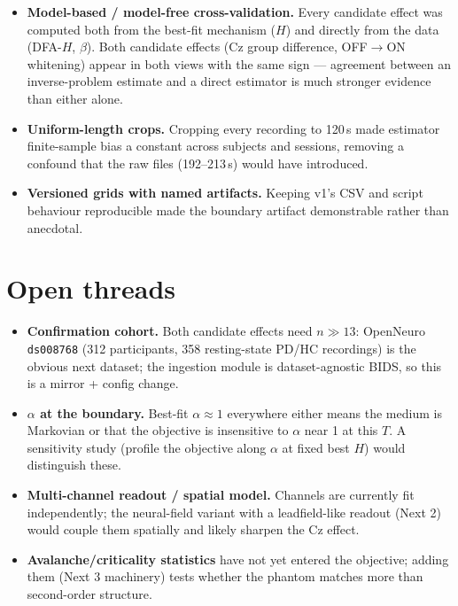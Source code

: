 \documentclass[11pt]{article}
\begin{document}
\begin{itemize}[leftmargin=1.6em]
  \item \textbf{Model-based / model-free cross-validation.} Every candidate
        effect was computed both from the best-fit mechanism ($H$) and
        directly from the data (DFA-$H$, $\beta$). Both candidate effects
        (Cz group difference, OFF$\to$ON whitening) appear in both views with
        the same sign --- agreement between an inverse-problem estimate and a
        direct estimator is much stronger evidence than either alone.
  \item \textbf{Uniform-length crops.} Cropping every recording to 120\,s
        made estimator finite-sample bias a constant across subjects and
        sessions, removing a confound that the raw files (192--213\,s) would
        have introduced.
  \item \textbf{Versioned grids with named artifacts.} Keeping v1's CSV and
        script behaviour reproducible made the boundary artifact
        demonstrable rather than anecdotal.
\end{itemize}

\section{Open threads}

\begin{itemize}[leftmargin=1.6em]
  \item \textbf{Confirmation cohort.} Both candidate effects need $n \gg 13$:
        OpenNeuro \texttt{ds008768} (312 participants, 358 resting-state PD/HC
        recordings) is the obvious next dataset; the ingestion module is
        dataset-agnostic BIDS, so this is a mirror + config change.
  \item \textbf{$\alpha$ at the boundary.} Best-fit $\alpha \approx 1$
        everywhere either means the medium is Markovian or that the objective
        is insensitive to $\alpha$ near 1 at this $T$. A sensitivity study
        (profile the objective along $\alpha$ at fixed best $H$) would
        distinguish these.
  \item \textbf{Multi-channel readout / spatial model.} Channels are
        currently fit independently; the neural-field variant with a
        leadfield-like readout (Next 2) would couple them spatially and
        likely sharpen the Cz effect.
  \item \textbf{Avalanche/criticality statistics} have not yet entered the
        objective; adding them (Next 3 machinery) tests whether the phantom
        matches more than second-order structure.
\end{itemize}
\end{document}
